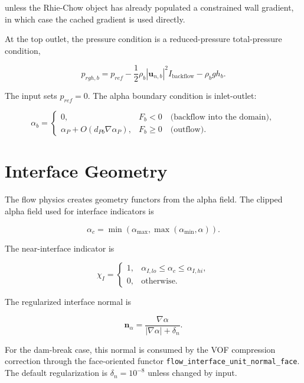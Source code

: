 \documentclass[11pt]{article}
\newcommand{\grad}{\nabla}
\begin{document}
unless the Rhie-Chow object has already populated a constrained wall gradient,
in which case the cached gradient is used directly.

At the top outlet, the pressure condition is a reduced-pressure total-pressure
condition,

\begin{equation}
  p_{rgh,b}
  =
  p_{ref}
  -
  \frac{1}{2}\rho_b
  |\mathbf{u}_{n,b}|^2 I_{\mathrm{backflow}}
  -
  \rho_b gh_b.
  \label{eq:top-prgh}
\end{equation}

The input sets \(p_{ref}=0\).  The alpha boundary condition is inlet-outlet:

\begin{equation}
  \alpha_b =
  \begin{cases}
    0, & F_b<0\quad\text{(backflow into the domain)},\\
    \alpha_P + O(d_{Pb}\grad\alpha_P), & F_b\ge 0\quad\text{(outflow)}.
  \end{cases}
\end{equation}

\section{Interface Geometry}

The flow physics creates geometry functors from the alpha field.  The clipped
alpha field used for interface indicators is

\begin{equation}
  \alpha_c=\min(\alpha_{\max},\max(\alpha_{\min},\alpha)).
\end{equation}

The near-interface indicator is

\begin{equation}
  \chi_I =
  \begin{cases}
    1, & \alpha_{I,lo}\le \alpha_c\le \alpha_{I,hi},\\
    0, & \text{otherwise}.
  \end{cases}
\end{equation}

The regularized interface normal is

\begin{equation}
  \mathbf{n}_{\alpha}
  =
  \frac{\grad\alpha}{|\grad\alpha|+\delta_n}.
  \label{eq:interface-normal}
\end{equation}

For the dam-break case, this normal is consumed by the VOF compression
correction through the face-oriented functor
\texttt{flow\_interface\_unit\_normal\_face}.  The default regularization is
\(\delta_n=10^{-8}\) unless changed by input.
\end{document}
